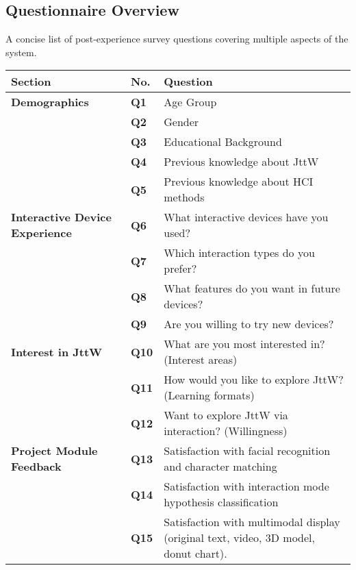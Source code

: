 \subsection{Questionnaire Overview}
A concise list of post-experience survey questions covering multiple aspects of the system.
\begin{table}[H]
\centering
\begin{tabular}{lll}
\toprule
\textbf{Section} & \textbf{No.} & \textbf{Question}  \\
\hline
\textbf{Demographics} & \textbf{Q1} & Age Group \\
~ & \textbf{Q2} & Gender \\
~ & \textbf{Q3} & Educational Background\\
~ & \textbf{Q4} & Previous knowledge about JttW\\
\vspace{0.5em}
~ & \textbf{Q5} & Previous knowledge about HCI methods\\
\textbf{Interactive Device Experience} & \textbf{Q6} & What interactive devices have you used? %
\\
~ & \textbf{Q7} & Which interaction types do you prefer?\\
~ & \textbf{Q8} & What features do you want in future devices?\\
\vspace{0.5em}
~ & \textbf{Q9} & Are you willing to try new devices?\\
\textbf{Interest in JttW} & \textbf{Q10} & What are you most interested in? (Interest areas)\\
~ & \textbf{Q11} & How would you like to explore JttW? (Learning formats)\\
\vspace{0.5em}
~ & \textbf{Q12} & Want to explore JttW via interaction? (Willingness)\\
\textbf{Project Module Feedback} & \textbf{Q13} & Satisfaction with facial recognition and character matching\\
~ & \textbf{Q14} & Satisfaction with interaction mode hypothesis classification\\
~ & \textbf{Q15} & Satisfaction with multimodal display (original text, video, 3D model, donut chart).\\

\end{tabular}
\end{table}
